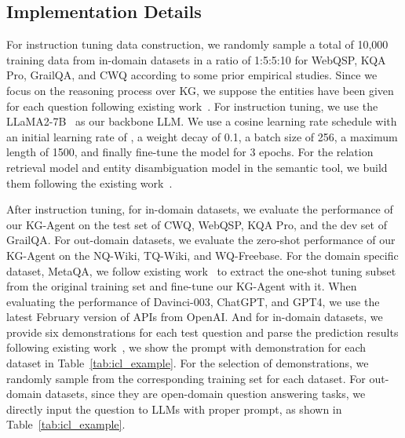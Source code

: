 \subsection{Implementation Details}
For instruction tuning data construction, we randomly sample a total of 10,000 training data from in-domain datasets in a ratio of 1:5:5:10 for WebQSP, KQA Pro, GrailQA, and CWQ according to some prior empirical studies.
Since we focus on the reasoning process over KG, we suppose the entities have been given for each question following existing work~\cite{GraftNet, NSM, Jiang-2023-arxiv-StructGPT}.
For instruction tuning, we use the LLaMA2-7B~\cite{LLaMA2} as our backbone LLM. We use a cosine learning rate schedule with an initial learning rate of , a weight decay of 0.1, a batch size of 256, a maximum length of 1500, and finally fine-tune the model for 3 epochs. 
For the relation retrieval model and entity disambiguation model in the semantic tool, we build them following the existing work~\cite{Zhang-ACL-22, TIARA}.

After instruction tuning, for in-domain datasets, we evaluate the performance of our KG-Agent on the test set of CWQ, WebQSP, KQA Pro, and the dev set of GrailQA.
For out-domain datasets, we evaluate the zero-shot performance of our KG-Agent on the NQ-Wiki, TQ-Wiki, and WQ-Freebase.
For the domain specific dataset, \ie MetaQA, we follow existing work~\cite{NSM, Jiang-2023-arxiv-StructGPT} to extract the one-shot tuning subset from the original training set and fine-tune our KG-Agent with it.
When evaluating the performance of Davinci-003, ChatGPT, and GPT4, we use the latest February version of APIs from OpenAI. And for in-domain datasets, we provide six demonstrations for each test question and parse the prediction results following existing work~\cite{ToG,Jiang-2023-arxiv-StructGPT}, we show the prompt with demonstration for each dataset in Table~\ref{tab:icl_example}.
For the selection of demonstrations, we randomly sample from the corresponding training set for each dataset.
For out-domain datasets, since they are open-domain question answering tasks, we directly input the question to LLMs with proper prompt, as shown in Table~\ref{tab:icl_example}.




